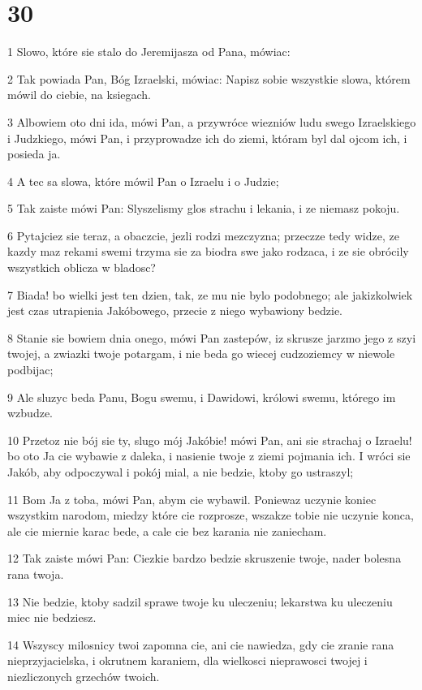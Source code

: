 \chapter{30}

\par 1 Slowo, które sie stalo do Jeremijasza od Pana, mówiac:
\par 2 Tak powiada Pan, Bóg Izraelski, mówiac: Napisz sobie wszystkie slowa, którem mówil do ciebie, na ksiegach.
\par 3 Albowiem oto dni ida, mówi Pan, a przywróce wiezniów ludu swego Izraelskiego i Judzkiego, mówi Pan, i przyprowadze ich do ziemi, któram byl dal ojcom ich, i posieda ja.
\par 4 A tec sa slowa, które mówil Pan o Izraelu i o Judzie;
\par 5 Tak zaiste mówi Pan: Slyszelismy glos strachu i lekania, i ze niemasz pokoju.
\par 6 Pytajciez sie teraz, a obaczcie, jezli rodzi mezczyzna; przeczze tedy widze, ze kazdy maz rekami swemi trzyma sie za biodra swe jako rodzaca, i ze sie obrócily wszystkich oblicza w bladosc?
\par 7 Biada! bo wielki jest ten dzien, tak, ze mu nie bylo podobnego; ale jakizkolwiek jest czas utrapienia Jakóbowego, przecie z niego wybawiony bedzie.
\par 8 Stanie sie bowiem dnia onego, mówi Pan zastepów, iz skrusze jarzmo jego z szyi twojej, a zwiazki twoje potargam, i nie beda go wiecej cudzoziemcy w niewole podbijac;
\par 9 Ale sluzyc beda Panu, Bogu swemu, i Dawidowi, królowi swemu, którego im wzbudze.
\par 10 Przetoz nie bój sie ty, slugo mój Jakóbie! mówi Pan, ani sie strachaj o Izraelu! bo oto Ja cie wybawie z daleka, i nasienie twoje z ziemi pojmania ich. I wróci sie Jakób, aby odpoczywal i pokój mial, a nie bedzie, ktoby go ustraszyl;
\par 11 Bom Ja z toba, mówi Pan, abym cie wybawil. Poniewaz uczynie koniec wszystkim narodom, miedzy które cie rozprosze, wszakze tobie nie uczynie konca, ale cie miernie karac bede, a cale cie bez karania nie zaniecham.
\par 12 Tak zaiste mówi Pan: Ciezkie bardzo bedzie skruszenie twoje, nader bolesna rana twoja.
\par 13 Nie bedzie, ktoby sadzil sprawe twoje ku uleczeniu; lekarstwa ku uleczeniu miec nie bedziesz.
\par 14 Wszyscy milosnicy twoi zapomna cie, ani cie nawiedza, gdy cie zranie rana nieprzyjacielska, i okrutnem karaniem, dla wielkosci nieprawosci twojej i niezliczonych grzechów twoich.
